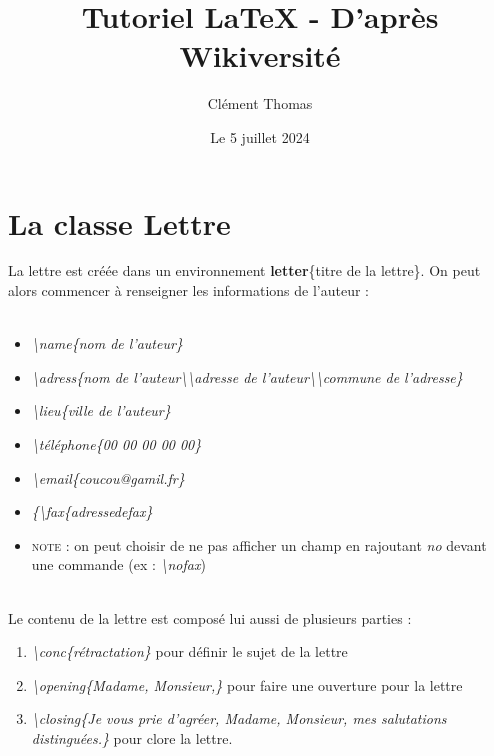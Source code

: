 \documentclass[a4paper, 10pt]{book}
\begin{document}
\frontmatter

\title{Tutoriel LaTeX - D'après Wikiversité}
\author{Clément Thomas}
\date{Le 5 juillet 2024}
\maketitle

\mainmatter

\chapter{La classe Lettre}
La lettre est créée dans un environnement \textbf{letter}\{titre de la lettre\}. On peut alors commencer à renseigner les informations de l'auteur : \\ \\

\begin{itemize}
\item \textit{\textbackslash name\{nom de l'auteur\}}
\item \textit{\textbackslash adress\{nom de l'auteur\textbackslash \textbackslash adresse de l'auteur\textbackslash \textbackslash commune de l'adresse\}}
\item \textit{\textbackslash lieu\{ville de l'auteur\}}
\item \textit{\textbackslash téléphone\{00 00 00 00 00\}}
\item \textit{\textbackslash email\{coucou@gamil.fr\}}
\item \textit{\{\textbackslash fax\{adressedefax\}}
\item \textsc{note} : on peut choisir de ne pas afficher un champ en rajoutant \textit{no} devant une commande (ex : \textit{\textbackslash nofax})\\ \\
\end{itemize}

Le contenu de la lettre est composé lui aussi de plusieurs parties :\\

\begin{enumerate}
\item \textit{\textbackslash conc\{rétractation\}} pour définir le sujet de la lettre
\item \textit{\textbackslash opening\{Madame, Monsieur,\}} pour faire une ouverture pour la lettre
\item \textit{\textbackslash closing\{Je vous prie d'agréer, Madame, Monsieur,
mes salutations distinguées.\}} pour clore la lettre.\\ \\
\end{enumerate}	
\end{document}
